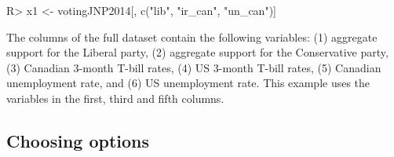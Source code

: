 \documentclass[article]{jss}
\begin{document}


\begin{Code}
R> x1 <- votingJNP2014[, c("lib", "ir_can", "un_can")]
\end{Code}



The columns of the full dataset contain the following variables: (1) aggregate support for the Liberal party, (2) aggregate support for the Conservative party, (3) Canadian 3-month T-bill rates, (4) US 3-month T-bill rates, (5) Canadian unemployment rate, and (6) US unemployment rate. 
This example uses the variables in the first, third and fifth columns. 

\subsection{Choosing options}
\label{subsec choosing options}
\end{document}
